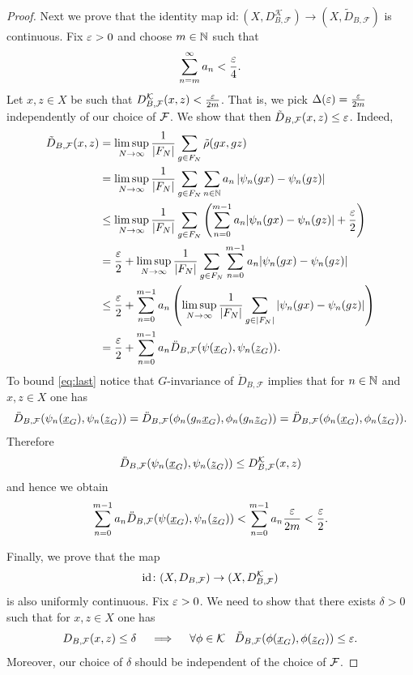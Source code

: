 \begin{proof}
Next we prove that the identity map $\textrm{id}\colon (X, D^\mathcal{K}_{B,\mathcal F})\to (X,\tilde D_{B,\mathcal F})$ is continuous.
Fix $\varepsilon>0$ and choose $m\in\mathbb{N}$ such that
\[
\sum_{n=m}^\infty a_n<\frac{\varepsilon}{4}.
\]
Let $x,z\in X$ be such that $D^{\mathcal{K}}_{B,\mathcal F}(x,z)<\frac{\varepsilon}{2m}$.
%
That is, we pick $\Delta(\varepsilon)=\frac{\varepsilon}{2m}$ independently of our choice of $\operatorname{\mathcal{F}}$.
%
We show that then $\tilde D_{B,\mathcal F}(x,z)\leq\varepsilon$.
Indeed,
\begin{align}
\tilde D_{B,\mathcal F}(x,z)&=\limsup_{N\to\infty}\frac{1}{|F_N|}\sum_{g\in F_N}\tilde\rho(gx,gz) \nonumber \\
&=\limsup_{N\to\infty}\frac{1}{|F_N|}\sum_{g\in F_N}\sum_{n\in\mathbb{N}} a_n \left|\psi_n(gx)-\psi_n(gz)\right| \nonumber \\ 
&\leq\limsup_{N\to\infty}\frac{1}{|F_N|}\sum_{g\in F_N}\left(\sum_{n=0}^{m-1} a_n |\psi_n(gx)-\psi_n(gz)|+\frac{\varepsilon}{2}\right)  \nonumber \\
&=\frac{\varepsilon}{2} + \limsup_{N\to\infty}\frac{1}{|F_N|}\sum_{g\in F_N}\sum_{n=0}^{m-1} a_n |\psi_n(gx)-\psi_n(gz)| \nonumber\\
&\leq\frac{\varepsilon}{2} + \sum_{n=0}^{m-1} a_n \left(\limsup_{N\to\infty}\frac{1}{|F_N|}\sum_{g\in |F_N|}|\psi_n(gx)-\psi_n(gz)|\right)\nonumber \\
&=\frac{\varepsilon}{2} + \sum_{n=0}^{m-1} a_n \ddot D_{B,\operatorname{\mathcal{F}}}(\psi(\underline{x}_G),\psi_n(\underline{z}_G)).\label{eq:last}
\end{align}
To bound \eqref{eq:last} notice that $G$-invariance of $\ddot D_{B,\mathcal F}$ implies that for  $n\in \mathbb{N}$ and $x,z\in X$ one has
\[
\ddot D_{B,\mathcal F}(\psi_n(\und{x}_G),\psi_n(\und{z}_G))=%
\ddot D_{B,\mathcal F}(\phi_n(g_n\und{x}_G),\phi_n(g_n\und{z}_G))=\ddot D_{B,\mathcal F}(\phi_n(\und{x}_G),\phi_n(\und{z}_G)).
\]
Therefore
\begin{align*}
\ddot D_{B,\mathcal F}(\psi_n(\underline{x}_G),\psi_n(\underline{z}_G))\le D^{\mathcal{K}}_{B,\mathcal F}(x,z)
\end{align*}
and hence we obtain
\[
\sum_{n=0}^{m-1} a_n \ddot D_{B,\operatorname{\mathcal{F}}}(\psi(\underline{x}_G),\psi_n(\underline{z}_G))< \sum_{n=0}^{m-1} a_n \frac{\varepsilon}{2m} < \frac{\varepsilon}{2}.
\]


Finally, we prove that the map
\[
\textrm{id}\colon (X, D_{B,\operatorname{\mathcal{F}}})\to (X,D^{\operatorname{\mathcal{K}}}_{B,\operatorname{\mathcal{F}}})
\]
is also uniformly continuous. Fix $\varepsilon>0$. We need to show that there exists $\delta>0$ such that for $x,z\in X$ one has
\[
D_{B,\operatorname{\mathcal{F}}}(x,z)\leq\delta \quad \implies \quad \forall \phi\in\operatorname{\mathcal{K}}~~ \ddot D_{B,\operatorname{\mathcal{F}}}(\phi(\underline{x}_G),\phi(\underline{z}_G))\leq\varepsilon.
\]
Moreover, our choice of $\delta$ should be independent of the choice of $\operatorname{\mathcal{F}}$.


\end{proof}

